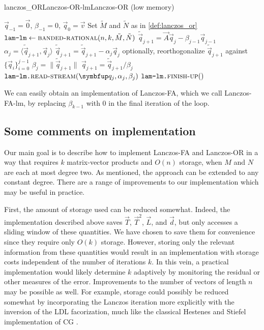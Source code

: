 \begin{labelalgorithm}[htb]{lanczos_OR}{Lanczos-OR-lm}{Lanczos-OR (low memory)}
\begin{algorithmic}[1]
\State \( \vec{q}_{-1} = \vec{0} \),
\( \beta_{-1} = 0 \),
    \( \vec{q}_0  = \vec{v} \)
\State Set $\tilde{M}$ and $\tilde{N}$ as in \cref{def:lanczos_or}
\State $\texttt{lam-lm} \gets \textsc{banded-rational}(n,k,\tilde{M},\tilde{N})$
    \State \( \tilde{\vec{q}}_{j+1} = \vec{A} \vec{q}_{j} - \beta_{j-1} \vec{q}_{j-1} \)
    \State \( \alpha_j = \langle \tilde{\vec{q}}_{j+1}, \vec{q}_j \rangle \)
    \State \( \tilde{\vec{q}}_{j+1} = \tilde{\vec{q}}_{j+1} - \alpha_j \vec{q}_j \)
        \State optionally, reorthogonalize \( \tilde{\vec{q}}_{j+1} \) against \( \{\vec{q}_i\}_{i=0}^{j-1} \)
    \State \( \beta_{j} = \| \tilde{\vec{q}}_{j+1} \| \)
    \State \( \vec{q}_{j+1} = \tilde{\vec{q}}_{j+1} / \beta_{j} \)
    \State $\ms{lam-lm.}\textsc{read-stream}(\vec{q}_{j},\alpha_{j},\beta_{j})$
\EndFor
\State $\texttt{lam-lm.}\textsc{finish-up}()$
\EndProcedure 
\end{algorithmic}
\end{labelalgorithm}

We can easily obtain an implementation of Lanczos-FA, which we call Lanczos-FA-lm, by replacing $\beta_{k-1}$ with $0$ in the final iteration of the loop. 

\subsection{Some comments on implementation}

Our main goal is to describe how to implement Lanczos-FA and Lanczos-OR in a way that requires $k$ matrix-vector products and $O(n)$ storage, when $M$ and $N$ are each at most degree two. As mentioned, the approach can be extended to any constant degree.
There are a range of improvements to our implementation which may be useful in practice.

First, the amount of storage used can be reduced somewhat.
Indeed, the implementation described above saves $\vec{T}$, $\vec{T}^2$, $\vec{L}$, and $\vec{d}$, but only accesses a sliding window of these quantities.
We have chosen to save them for convenience since they require only $O(k)$ storage.
However, storing only the relevant information from these quantities would result in an implementation with storage costs independent of the number of iterations $k$.
In this vein, a practical implementation would likely determine $k$ adaptively by monitoring the residual or other measures of the error.
Improvements to the number of vectors of length $n$ may be possible as well.
For example, storage could possibly be reduced somewhat by incorporating the Lanczos iteration more explicitly with the inversion of the LDL facorization, much like the classical Hestenes and Stiefel implementation of CG \cite{hestenes_stiefel_52}.


